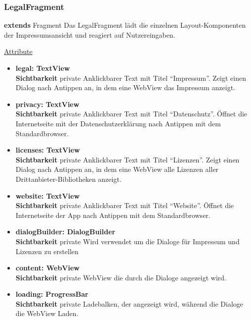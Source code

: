\subsubsection{LegalFragment} \label{app:klasse:LegalFragment}
\textbf{extends} Fragment \newline
Das LegalFragment lädt die einzelnen Layout-Komponenten der Impressumsansicht und reagiert auf Nutzereingaben.
\newline

\underline{Attribute}
\begin{itemize}
\itemsep0pt
\item \textbf{legal: TextView} \hfill\\ 
\textbf{Sichtbarkeit} private \newline
Anklickbarer Text mit Titel ``Impressum''. Zeigt einen Dialog nach Antippen an, in dem eine WebView das Impressum anzeigt.

\item \textbf{privacy: TextView} \hfill\\ 
\textbf{Sichtbarkeit} private \newline
Anklickbarer Text mit Titel ``Datenschutz''. Öffnet die Internetseite mit der Datenschutzerklärung nach Antippen mit dem Standardbrowser.

\item \textbf{licenses: TextView} \hfill\\ 
\textbf{Sichtbarkeit} private \newline
Anklickbarer Text mit Titel ``Lizenzen''. Zeigt einen Dialog nach Antippen an, in dem eine WebView alle Lizenzen aller Drittanbieter-Bibliotheken anzeigt.

\item \textbf{website: TextView} \hfill\\ 
\textbf{Sichtbarkeit} private \newline
Anklickbarer Text mit Titel ``Website''. Öffnet die Internetseite der App nach Antippen mit dem Standardbrowser.

\item \textbf{dialogBuilder: DialogBuilder} \hfill\\ 
\textbf{Sichtbarkeit} private \newline
Wird verwendet um die Dialoge für Impressum und Lizenzen zu erstellen

\item \textbf{content: WebView} \hfill\\ 
\textbf{Sichtbarkeit} private \newline
WebView die durch die Dialoge angezeigt wird.

\item \textbf{loading: ProgressBar} \hfill\\ 
\textbf{Sichtbarkeit} private \newline
Ladebalken, der angezeigt wird, während die Dialoge die WebView Laden.

\end{itemize}

